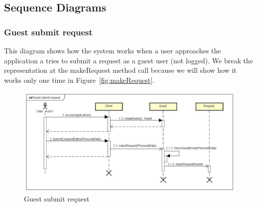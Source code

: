 	\subsection{Sequence Diagrams}
	\label{subsec:Sequence Diagrams}
		\subsubsection{Guest submit request}
		This diagram shows how the system works when a user approaches the application a tries to submit
		a request as a guest user (not logged). We break the representation at the makeRequest method call
		because we will show how it works only one time in Figure~\ref{fig:makeRequest}.
		\begin{figure}[h!]
			\begin{center}
				\includegraphics[width=1\linewidth]{../SE2_SD/GuestSubmitRequest}
				\caption{Guest submit request}
			\end{center}
		\end{figure}
		\clearpage
